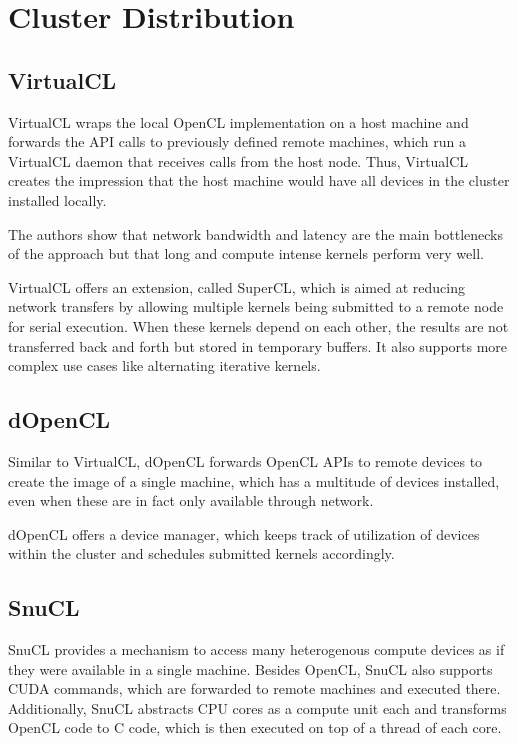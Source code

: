 \section{Cluster Distribution}

\subsection*{VirtualCL\cite{virtualcl}}

VirtualCL wraps the local OpenCL implementation on a host machine and forwards the API calls to previously defined remote machines, which run a VirtualCL daemon that receives calls from the host node. Thus, VirtualCL creates the impression that the host machine would have all devices in the cluster installed locally.

The authors show that network bandwidth and latency are the main bottlenecks of the approach but that long and compute intense kernels perform very well.

VirtualCL offers an extension, called SuperCL, which is aimed at reducing network transfers by allowing multiple kernels being submitted to a remote node for serial execution. When these kernels depend on each other, the results are not transferred back and forth but stored in temporary buffers. It also supports more complex use cases like alternating iterative kernels.

\subsection*{dOpenCL\cite{dopencl}}

Similar to VirtualCL, dOpenCL forwards OpenCL APIs to remote devices to create the image of a single machine, which has a multitude of devices installed, even when these are in fact only available through network.

dOpenCL offers a device manager, which keeps track of utilization of devices within the cluster and schedules submitted kernels accordingly.

\subsection*{SnuCL\cite{snucl}}

SnuCL provides a mechanism to access many heterogenous compute devices as if they were available in a single machine. Besides OpenCL, SnuCL also supports CUDA commands, which are forwarded to remote machines and executed there. Additionally, SnuCL abstracts CPU cores as a compute unit each and transforms OpenCL code to C code, which is then executed on top of a thread of each core.

